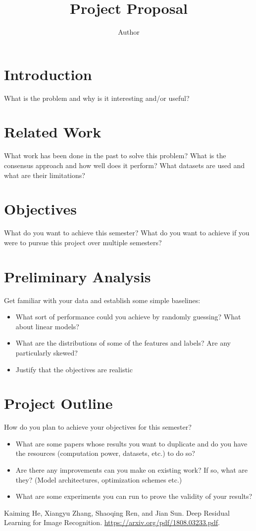 \documentclass{article}
\title{Project Proposal}
\author{Author}
\begin{document}
\maketitle

\section{Introduction}
What is the problem and why is it interesting and/or useful?

\section{Related Work}
What work has been done in the past to solve this problem? What is the consensus approach and how well does it perform? What datasets are used and what are their limitations?

\section{Objectives}
What do you want to achieve this semester? What do you want to achieve if you were to pursue this project over multiple semesters?

\section{Preliminary Analysis}
Get familiar with your data and establish some simple baselines:
\begin{itemize}
    \item What sort of performance could you achieve by randomly guessing? What about linear models?
    \item What are the distributions of some of the features and labels? Are any particularly skewed?
    \item Justify that the objectives are realistic
\end{itemize}

\section{Project Outline}
How do you plan to achieve your objectives for this semester?
\begin{itemize}
    \item What are some papers whose results you want to duplicate and do you have the resources (computation power, datasets, etc.) to do so?
    \item Are there any improvements can you make on existing work? If so, what are they? (Model architectures, optimization schemes etc.)
    \item What are some experiments you can run to prove the validity of your results?
\end{itemize}


\begin{thebibliography}{9}

 Kaiming He, Xiangyu Zhang, Shaoqing Ren, and Jian Sun. Deep Residual Learning for Image Recognition. \href{https://arxiv.org/pdf/1808.03233.pdf}{https://arxiv.org/pdf/1808.03233.pdf}.

\end{thebibliography}
\end{document}
